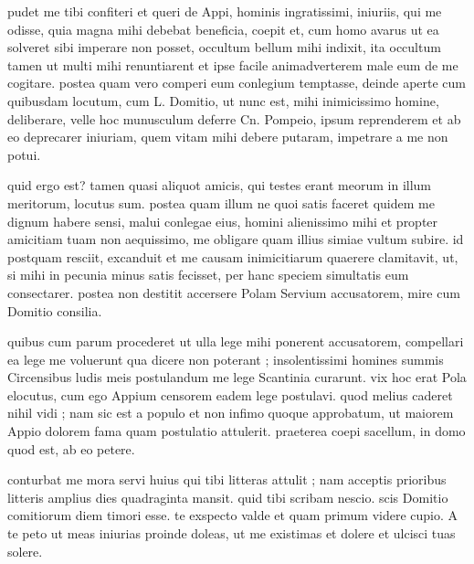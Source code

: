 


 pudet me tibi confiteri et queri de Appi, hominis ingratissimi, iniuriis, qui me odisse, quia magna mihi debebat beneficia, coepit et, cum homo avarus ut ea solveret sibi imperare non posset, occultum bellum mihi indixit, ita occultum tamen ut multi mihi renuntiarent et ipse facile animadverterem male eum de me cogitare. postea quam vero comperi eum conlegium temptasse, deinde aperte cum quibusdam locutum, cum L. Domitio, ut nunc est, mihi inimicissimo homine, deliberare, velle hoc munusculum deferre Cn. Pompeio, ipsum reprenderem et ab eo deprecarer iniuriam, quem vitam mihi debere putaram, impetrare a me non potui.

 quid ergo est? tamen quasi aliquot amicis, qui testes erant meorum in illum meritorum, locutus sum. postea quam illum ne quoi satis faceret quidem me dignum habere sensi, malui conlegae eius, homini alienissimo mihi et propter amicitiam tuam non aequissimo, me obligare quam illius simiae vultum subire. id postquam resciit, excanduit et me causam inimicitiarum quaerere clamitavit, ut, si mihi in pecunia minus satis fecisset, per hanc speciem simultatis eum consectarer. postea non destitit accersere Polam Servium accusatorem, mire cum Domitio consilia.

 quibus cum parum procederet ut ulla lege mihi ponerent accusatorem, compellari ea lege me voluerunt qua dicere non poterant ; insolentissimi homines summis Circensibus ludis meis postulandum me lege Scantinia curarunt. vix hoc erat Pola elocutus, cum ego Appium censorem eadem lege postulavi. quod melius caderet nihil vidi ; nam sic est a populo et non infimo quoque approbatum, ut maiorem Appio dolorem fama quam postulatio attulerit. praeterea coepi sacellum, in domo quod est, ab eo petere.

 conturbat me mora servi huius qui tibi litteras attulit ; nam acceptis prioribus litteris amplius dies quadraginta mansit. quid tibi scribam nescio. scis Domitio comitiorum diem timori esse. te exspecto valde et quam primum videre cupio. A te peto ut meas iniurias proinde doleas, ut me existimas et dolere et ulcisci tuas solere.
